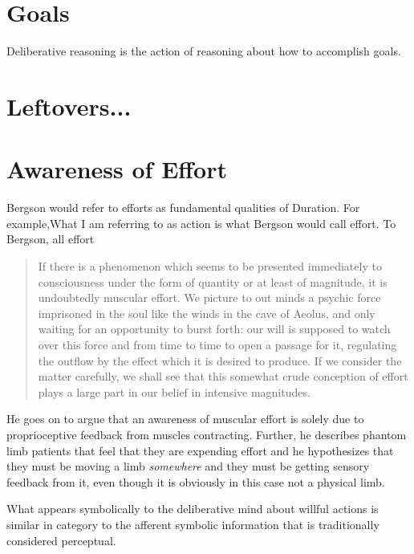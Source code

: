 \section{Goals}

Deliberative reasoning is the action of reasoning about how to
accomplish goals.  



\section{Leftovers...}

\section{Awareness of Effort}

Bergson would refer to efforts as fundamental qualities of Duration.
For example,What I am referring to as action is what Bergson would
call effort.  To Bergson, all effort

\begin{quote}
If there is a phenomenon which seems to be presented immediately to
consciousness under the form of quantity or at least of magnitude, it
is undoubtedly muscular effort.  We picture to out minds a psychic
force imprisoned in the soul like the winds in the cave of Aeolus, and
only waiting for an opportunity to burst forth: our will is supposed
to watch over this force and from time to time to open a passage for
it, regulating the outflow by the effect which it is desired to
produce.  If we consider the matter carefully, we shall see that this
somewhat crude conception of effort plays a large part in our belief
in intensive magnitudes.
\end{quote}

He goes on to argue that an awareness of muscular effort is solely due
to proprioceptive feedback from muscles contracting.  Further, he
describes phantom limb patients that feel that they are expending
effort and he hypothesizes that they must be moving a limb
\emph{somewhere} and they must be getting sensory feedback from it,
even though it is obviously in this case not a physical limb.

What appears symbolically to the deliberative mind about willful
actions is similar in category to the afferent symbolic information
that is traditionally considered perceptual.







